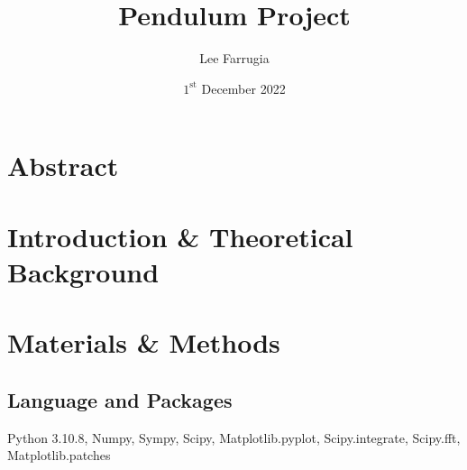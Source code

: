 \documentclass[12pt, a4paper]{article}
\title{Pendulum Project}
\date{\(1^\mathrm{{st}}\) December 2022}
\author{Lee Farrugia}
\begin{document}
    
\maketitle
\thispagestyle{titlepagestyle}
\pagestyle{mystyle}

\section{Abstract}


\section{Introduction \& Theoretical Background}


\section{Materials \& Methods}
\subsection{Language and Packages}
Python 3.10.8, Numpy, Sympy, Scipy, Matplotlib.pyplot, Scipy.integrate, Scipy.fft, Matplotlib.patches
\end{document}
